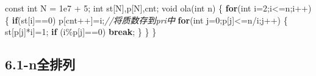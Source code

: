 \documentclass[
]{article}
\newenvironment{Shaded}{}{}
\newcommand{\AttributeTok}[1]{\textcolor[rgb]{0.49,0.56,0.16}{#1}}
\newcommand{\CommentTok}[1]{\textcolor[rgb]{0.38,0.63,0.69}{\textit{#1}}}
\newcommand{\ControlFlowTok}[1]{\textcolor[rgb]{0.00,0.44,0.13}{\textbf{#1}}}
\newcommand{\DataTypeTok}[1]{\textcolor[rgb]{0.56,0.13,0.00}{#1}}
\newcommand{\DecValTok}[1]{\textcolor[rgb]{0.25,0.63,0.44}{#1}}
\newcommand{\FloatTok}[1]{\textcolor[rgb]{0.25,0.63,0.44}{#1}}
\newcommand{\NormalTok}[1]{#1}
\newcommand{\OperatorTok}[1]{\textcolor[rgb]{0.40,0.40,0.40}{#1}}
\begin{document}
\begin{Shaded}
\begin{Highlighting}[]
\AttributeTok{const} \DataTypeTok{int}\NormalTok{  N }\OperatorTok{=} \FloatTok{1e7} \OperatorTok{+} \DecValTok{5}\OperatorTok{;}
\DataTypeTok{int}\NormalTok{ st}\OperatorTok{[}\NormalTok{N}\OperatorTok{],}\NormalTok{p}\OperatorTok{[}\NormalTok{N}\OperatorTok{],}\NormalTok{cnt}\OperatorTok{;}
\DataTypeTok{void}\NormalTok{ ola}\OperatorTok{(}\DataTypeTok{int}\NormalTok{ n}\OperatorTok{)}
\OperatorTok{\{}
    \ControlFlowTok{for}\OperatorTok{(}\DataTypeTok{int}\NormalTok{ i}\OperatorTok{=}\DecValTok{2}\OperatorTok{;}\NormalTok{i}\OperatorTok{\textless{}=}\NormalTok{n}\OperatorTok{;}\NormalTok{i}\OperatorTok{++)}
    \OperatorTok{\{}
        \ControlFlowTok{if}\OperatorTok{(}\NormalTok{st}\OperatorTok{[}\NormalTok{i}\OperatorTok{]==}\DecValTok{0}\OperatorTok{)}\NormalTok{ p}\OperatorTok{[}\NormalTok{cnt}\OperatorTok{++]=}\NormalTok{i}\OperatorTok{;}\CommentTok{//将质数存到pri中}
        \ControlFlowTok{for}\OperatorTok{(}\DataTypeTok{int}\NormalTok{ j}\OperatorTok{=}\DecValTok{0}\OperatorTok{;}\NormalTok{p}\OperatorTok{[}\NormalTok{j}\OperatorTok{]\textless{}=}\NormalTok{n}\OperatorTok{/}\NormalTok{i}\OperatorTok{;}\NormalTok{j}\OperatorTok{++)}
        \OperatorTok{\{}
\NormalTok{            st}\OperatorTok{[}\NormalTok{p}\OperatorTok{[}\NormalTok{j}\OperatorTok{]*}\NormalTok{i}\OperatorTok{]=}\DecValTok{1}\OperatorTok{;}
            \ControlFlowTok{if} \OperatorTok{(}\NormalTok{i}\OperatorTok{\%}\NormalTok{p}\OperatorTok{[}\NormalTok{j}\OperatorTok{]==}\DecValTok{0}\OperatorTok{)} \ControlFlowTok{break}\OperatorTok{;}
        \OperatorTok{\}}
    \OperatorTok{\}}
\OperatorTok{\}}
\end{Highlighting}
\end{Shaded}

\hypertarget{61-nux5168ux6392ux5217}{%
\subsection{6.1-n全排列}\label{61-nux5168ux6392ux5217}}
\end{document}
